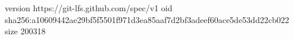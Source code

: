 version https://git-lfs.github.com/spec/v1
oid sha256:a10609442ae29bf5f5501f971d3ea85aaf7d2bf3adeef60ace5de53dd22cb022
size 200318
